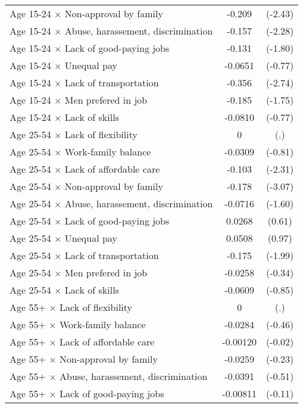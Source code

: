 {\begin{longtable}{l*{1}{cc}}
Age 15-24 $\times$ Non-approval by family&      -0.209\sym{*}  &     (-2.43)\\
Age 15-24 $\times$ Abuse, harassement, discrimination&      -0.157\sym{*}  &     (-2.28)\\
Age 15-24 $\times$ Lack of good-paying jobs&      -0.131         &     (-1.80)\\
Age 15-24 $\times$ Unequal pay&     -0.0651         &     (-0.77)\\
Age 15-24 $\times$ Lack of transportation&      -0.356\sym{**} &     (-2.74)\\
Age 15-24 $\times$ Men prefered in job&      -0.185         &     (-1.75)\\
Age 15-24 $\times$ Lack of skills&     -0.0810         &     (-0.77)\\
Age 25-54 $\times$ Lack of flexibility&           0         &         (.)\\
Age 25-54 $\times$ Work-family balance&     -0.0309         &     (-0.81)\\
Age 25-54 $\times$ Lack of affordable care&      -0.103\sym{*}  &     (-2.31)\\
Age 25-54 $\times$ Non-approval by family&      -0.178\sym{**} &     (-3.07)\\
Age 25-54 $\times$ Abuse, harassement, discrimination&     -0.0716         &     (-1.60)\\
Age 25-54 $\times$ Lack of good-paying jobs&      0.0268         &      (0.61)\\
Age 25-54 $\times$ Unequal pay&      0.0508         &      (0.97)\\
Age 25-54 $\times$ Lack of transportation&      -0.175\sym{*}  &     (-1.99)\\
Age 25-54 $\times$ Men prefered in job&     -0.0258         &     (-0.34)\\
Age 25-54 $\times$ Lack of skills&     -0.0609         &     (-0.85)\\
Age 55+ $\times$ Lack of flexibility&           0         &         (.)\\
Age 55+ $\times$ Work-family balance&     -0.0284         &     (-0.46)\\
Age 55+ $\times$ Lack of affordable care&    -0.00120         &     (-0.02)\\
Age 55+ $\times$ Non-approval by family&     -0.0259         &     (-0.23)\\
Age 55+ $\times$ Abuse, harassement, discrimination&     -0.0391         &     (-0.51)\\
Age 55+ $\times$ Lack of good-paying jobs&    -0.00811         &     (-0.11)\\

\end{longtable}}
